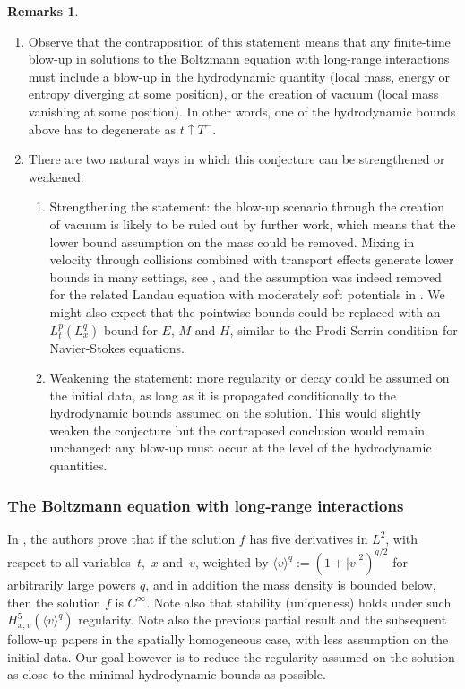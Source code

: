 \documentclass[JEP,XML,SOM,Unicode,NoFloatCountersInSection]{cedram}
\theoremstyle{plain}
\theoremstyle{definition}
\newtheorem{remarks}[thm]{Remarks}
\numberwithin{equation}{section}
\begin{document}
\skpt
\begin{remarks}
\begin{enumerate}
\item Observe that the contraposition of this statement means that
any finite-time blow-up in solutions to the Boltzmann equation
with long-range interactions must include a blow-up in the
hydrodynamic quantity (local mass, energy or entropy diverging at
some position), or the creation of vacuum (local mass vanishing at
some position). In other words, one of the hydrodynamic bounds
above has to degenerate as $t \uparrow T^-$.

\item There are two natural ways in which this conjecture can be
strengthened or weakened:
\begin{enumerate}
\item Strengthening the statement: the blow-up scenario through
the creation of vacuum is likely to be ruled out by further
work, which means that the lower bound assumption on the mass
could be removed. Mixing in velocity through collisions combined
with transport effects generate lower bounds in many settings,
see \cite{MR2153518,MR2746671,MR3375544,MR3356579}, and the
assumption was indeed removed for the related Landau equation
with moderately soft potentials in \cite{henderson2017local}.
We might also expect that the pointwise bounds could be replaced
with an $L_t^p(L_x^q)$ bound for $E$, $M$ and $H$, similar to
the Prodi-Serrin condition for Navier-Stokes equations.
\item Weakening the statement: more regularity or decay could be
assumed on the initial data, as long as it is propagated
conditionally to the hydrodynamic bounds assumed on the
solution. This would slightly weaken the conjecture but the
contraposed conclusion would remain unchanged: any blow-up must
occur at the level of the hydrodynamic quantities.
\end{enumerate}
\end{enumerate}
\end{remarks}


\subsubsection{The Boltzmann equation with long-range interactions}
In \cite{amuxy-arma2010}, the authors prove that if the solution $f$ has
five derivatives in $L^2$, with respect to all variables~$t$,~$x$ and~$v$, weighted by $\langle v \rangle^q := (1+|v|^2)^{q/2}$ for
arbitrarily large powers $q$, and in addition the mass density is
bounded below, then the solution $f$ is $C^\infty$. Note also that
stability (uniqueness) holds under such
$H^5_{x,v}(\langle v \rangle^q)$ regularity. Note also the previous
partial result \cite{MR2038147} and the subsequent follow-up papers
\cite{MR2149928,MR2425608,MR2462585,MR2476677,MR2476686} in the
spatially homogeneous case, with less assumption on the initial
data. Our goal however is to reduce the regularity assumed on the
solution as close to the minimal hydrodynamic bounds as possible.
\end{document}
